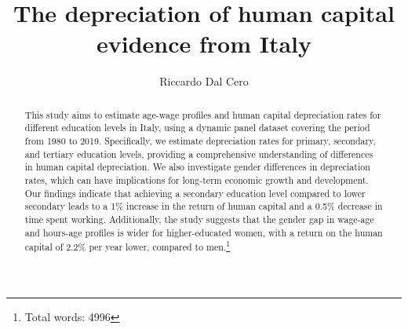\documentclass[12pt]{article}
\title{The depreciation of human capital evidence from Italy }
\author{ Riccardo Dal Cero }
\begin{document}
\maketitle
\begin{abstract}

This study aims to estimate age-wage profiles and human capital depreciation rates for different education levels in
Italy, using a dynamic panel dataset covering the period from 1980 to 2019. Specifically, we estimate depreciation rates
for primary, secondary, and tertiary education levels, providing a comprehensive understanding of differences in human
capital depreciation. We also investigate gender differences in depreciation rates, which can have implications for
long-term economic growth and development. Our findings indicate that achieving a secondary education level compared to
lower secondary leads to a 1\% increase in the return of human capital and a 0.5\% decrease in time spent working.
Additionally, the study suggests that the gender gap in wage-age and hours-age profiles is wider for higher-educated
women, with a return on the human capital of 2.2\% per year lower, compared to men.\footnote{Total words: 4996}
\end{abstract}

\newpage
\end{document}

